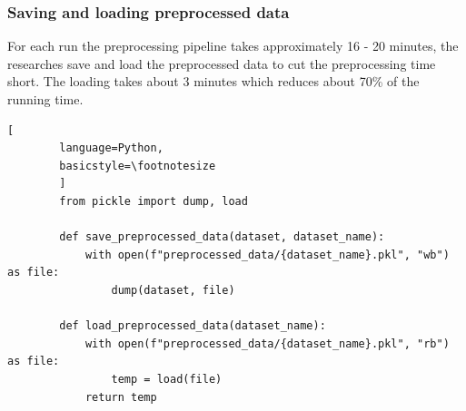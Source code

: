\documentclass[12pt]{diazessay}
\begin{document}
        \subsubsection{Saving and loading preprocessed data}
        For each run the preprocessing pipeline takes approximately 16 - 20 minutes, the researches save and load the preprocessed data to cut the preprocessing time short. The loading takes about 3 minutes which reduces about 70\% of the running time. 
        \begin{lstlisting}[
        language=Python,
        basicstyle=\footnotesize
        ]
        from pickle import dump, load

        def save_preprocessed_data(dataset, dataset_name):
            with open(f"preprocessed_data/{dataset_name}.pkl", "wb") as file:
                dump(dataset, file)
        
        def load_preprocessed_data(dataset_name):
            with open(f"preprocessed_data/{dataset_name}.pkl", "rb") as file:
                temp = load(file)
            return temp
        \end{lstlisting}
        
        
\end{document}
